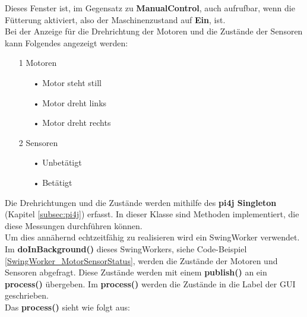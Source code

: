 Dieses Fenster ist, im Gegensatz zu \textbf{ManualControl}, auch aufrufbar, wenn die Fütterung aktiviert, also der Maschinenzustand auf \textbf{Ein}, ist.
\\ Bei der Anzeige für die Drehrichtung der Motoren und die Zustände der Sensoren kann Folgendes angezeigt werden:
\begin{itemize}
\item[1] Motoren
  \begin{itemize}
    \item[•] Motor steht still
    \item[•] Motor dreht links
    \item[•] Motor dreht rechts
  \end{itemize}
\item[2] Sensoren
  \begin{itemize}
    \item[•] Unbetätigt 
    \item[•] Betätigt 
  \end{itemize}
\end{itemize}

\vspace{10pt}

Die Drehrichtungen und die Zustände werden mithilfe des \textbf{\ac{pi4j} Singleton} (Kapitel \ref{subsec:pi4j}) erfasst. In dieser Klasse sind Methoden implementiert, die diese Messungen durchführen können.
\\ Um dies annähernd echtzeitfähig zu realisieren wird ein SwingWorker verwendet. Im \textbf{doInBackground()} dieses SwingWorkers, siehe Code-Beispiel \ref{SwingWorker_MotorSensorStatus}, werden die Zustände der Motoren und Sensoren abgefragt. Diese Zustände werden mit einem \textbf{publish()} an ein \textbf{process()} übergeben. Im \textbf{process()} werden die Zustände in die Label der \ac{GUI} geschrieben.
\\ Das \textbf{process()} sieht wie folgt aus:

\newpage

